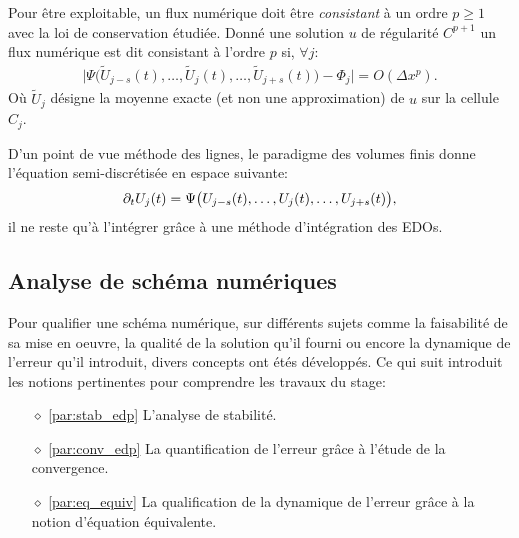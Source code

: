     \begin{definition}
        Pour être exploitable, un flux numérique doit être \textit{consistant} à un ordre $p\geq 1$ avec la loi de conservation étudiée.
        Donné une solution $u$ de régularité $C^{p+1}$ un flux numérique est dit consistant à l'ordre $p$ si, $\forall j$:
        \begin{align}
            \vert \Psi \bigl( \tilde U_{j-s}(t) , \ldots ,\tilde  U_j(t), \ldots ,  \tilde U_{j+s}(t)\bigr) -  \Phi_j \vert = O(\Delta x^p).
        \end{align}
        Où $\tilde U_j$ désigne la moyenne exacte (et non une approximation) de $u$ sur la cellule $C_j$.
    \end{definition}
    D'un point de vue méthode des lignes, le paradigme des volumes finis donne l'équation semi-discrétisée en espace suivante:
    \begin{align}
        \partial_t U_j(t) = \Psi \bigl( U_{j-s}(t) , \ldots , U_j(t), \ldots ,  U_{j+s}(t)\bigr),
    \end{align}
    il ne reste qu'à l'intégrer grâce à une méthode d'intégration des EDOs.


\subsection{Analyse de schéma numériques}
    Pour qualifier une schéma numérique, sur différents sujets comme 
    la faisabilité de sa mise en oeuvre, la qualité de la solution qu'il fourni ou encore la dynamique de l'erreur qu'il introduit, 
    divers concepts ont étés développés. Ce qui suit introduit les notions pertinentes pour comprendre les travaux du stage: 
    \begin{itemize}
        \item[$\diamond$] \ref{par:stab_edp} L'analyse de stabilité.
        \item[$\diamond$] \ref{par:conv_edp} La quantification de l'erreur grâce à l'étude de la convergence.
        \item[$\diamond$] \ref{par:eq_equiv} La qualification de la dynamique de l'erreur grâce à la notion d'équation équivalente.
    \end{itemize}

